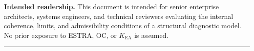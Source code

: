 \vspace{4mm}

\noindent\textbf{Intended readership.}
This document is intended for senior enterprise architects, systems
engineers, and technical reviewers evaluating the internal coherence,
limits, and admissibility conditions of a structural diagnostic model.
No prior exposure to ESTRA, OC, or $K_{\mathrm{EA}}$ is assumed.

\vspace{6mm}

\noindent\rule{\linewidth}{0.4pt}


